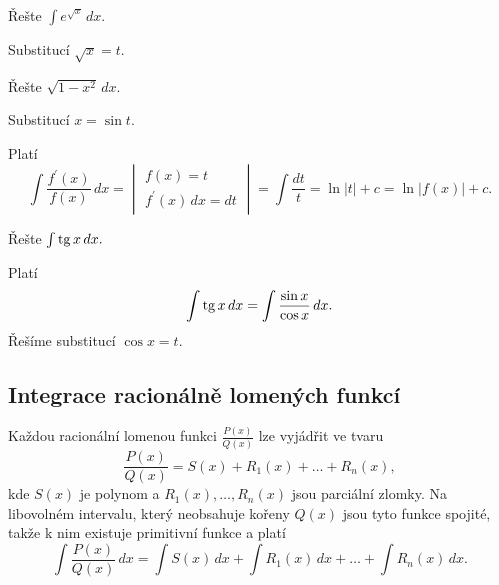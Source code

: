 \begin{priklad}
Řešte $\int e^{\sqrt{x} }\, dx$.
\end{priklad}

\begin{reseni}
Substitucí $\sqrt{x}=t $.
\end{reseni}

\begin{priklad}
Řešte $\sqrt{1-x^2}\, dx.$
\end{priklad}

\begin{reseni}
Substitucí $x=\sin t$.
\end{reseni}

\begin{pozn}
    Platí
    $$\int \frac{f^\prime(x)}{f(x)}\, dx=\begin{vmatrix}
        f(x)=t \\
        f^\prime(x) \, dx = dt
    \end{vmatrix}=\int \frac{dt}{t}=\ln |t|+c=\ln |f(x)|+c.$$
\end{pozn}

\begin{priklad}
Řešte $\int \operatorname{tg} x\, dx.$
\end{priklad}

\begin{reseni}
Platí
$$\int \operatorname{tg} x\, dx=\int \frac{\sin x}{\cos x}\, dx.$$
Řešíme substitucí $\cos x=t.$
\end{reseni}

\subsection*{Integrace racionálně lomených funkcí}
\begin{pozn}
    Každou racionální lomenou funkci $\frac{P(x)}{Q(x)}$ lze vyjádřit ve tvaru
    $$\frac{P(x)}{Q(x)}=S(x)+R_1(x)+\dots+R_n(x),$$
    kde $S(x)$ je polynom a $R_1(x),\dots,R_n(x)$ jsou parciální zlomky.
    Na libovolném intervalu, který neobsahuje kořeny $Q(x)$ jsou tyto funkce spojité,
    takže k nim existuje primitivní funkce a platí
    $$\int \frac{P(x)}{Q(x)} \, dx=\int S(x)\, dx + \int R_1(x)\, dx + \dots + \int R_n(x)\, dx.$$
\end{pozn}

